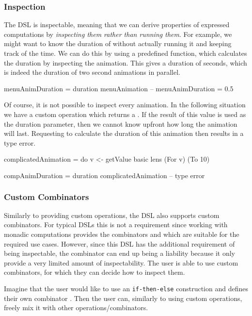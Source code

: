 \subsubsection{Inspection}

The DSL is inspectable, meaning that we can derive properties of expressed computations by \emph{inspecting them rather than running them}. For example, we might want to know the duration of  without actually running it and keeping track of the time. We can do this by using a predefined  function, which calculates the duration by inspecting the animation. This gives a duration of  seconds, which is indeed the duration of two  second animations in parallel.

\begin{spec}
menuAnimDuration = duration menuAnimation
-- menuAnimDuration = 0.5 
\end{spec}

Of course, it is not possible to inspect every animation. In the following situation we have a custom operation  which returns a . If the result of this value is used as the duration parameter, then we cannot know upfront how long the animation will last. Requesting to calculate the duration of this animation then results in a type error.

\begin{spec}
complicatedAnimation = do
  v <- getValue
  basic lens (For v) (To 10)

compAnimDuration = duration complicatedAnimation
-- type error
\end{spec}

\subsubsection{Custom Combinators}

Similarly to providing custom operations, the DSL also supports custom combinators. For typical DSLs this is not a requirement since working with monadic computations provides the combinators \hs{>>=} and  which are suitable for the required use cases. However, since this DSL has the additional requirement of being inspectable, the \hs{>>=} combinator can end up being a liability because it only provide a very limited amount of inspectability. The user is able to use custom combinators, for which they can decide how to inspect them.

Imagine that the user would like to use an \texttt{if-then-else} construction and defines their own combinator . Then the user can, similarly to using custom operations, freely mix it with other operations/combinators.

